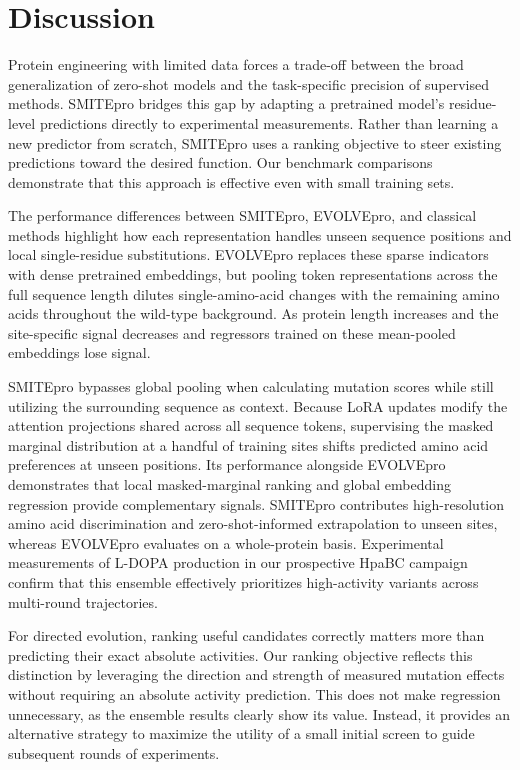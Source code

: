\documentclass[sn-nature]{sn-jnl}
\begin{document}
\section{Discussion}

Protein engineering with limited data forces a trade-off between the broad generalization of zero-shot models and the task-specific precision of supervised methods. SMITEpro bridges this gap by adapting a pretrained model's residue-level predictions directly to experimental measurements. Rather than learning a new predictor from scratch, SMITEpro uses a ranking objective to steer existing predictions toward the desired function. Our benchmark comparisons demonstrate that this approach is effective even with small training sets.

The performance differences between SMITEpro, EVOLVEpro, and classical methods highlight how each representation handles unseen sequence positions and local single-residue substitutions. EVOLVEpro replaces these sparse indicators with dense pretrained embeddings, but pooling token representations across the full sequence length dilutes single-amino-acid changes with the remaining amino acids throughout the wild-type background. As protein length increases and the site-specific signal decreases and regressors trained on these mean-pooled embeddings lose signal.

SMITEpro bypasses global pooling when calculating mutation scores while still utilizing the surrounding sequence as context. Because LoRA updates modify the attention projections shared across all sequence tokens, supervising the masked marginal distribution at a handful of training sites shifts predicted amino acid preferences at unseen positions. Its performance alongside EVOLVEpro demonstrates that local masked-marginal ranking and global embedding regression provide complementary signals. SMITEpro contributes high-resolution amino acid discrimination and zero-shot-informed extrapolation to unseen sites, whereas EVOLVEpro evaluates on a whole-protein basis. Experimental measurements of L-DOPA production in our prospective HpaBC campaign confirm that this ensemble effectively prioritizes high-activity variants across multi-round trajectories.

For directed evolution, ranking useful candidates correctly matters more than predicting their exact absolute activities. Our ranking objective reflects this distinction by leveraging the direction and strength of measured mutation effects without requiring an absolute activity prediction. This does not make regression unnecessary, as the ensemble results clearly show its value. Instead, it provides an alternative strategy to maximize the utility of a small initial screen to guide subsequent rounds of experiments.
\end{document}
